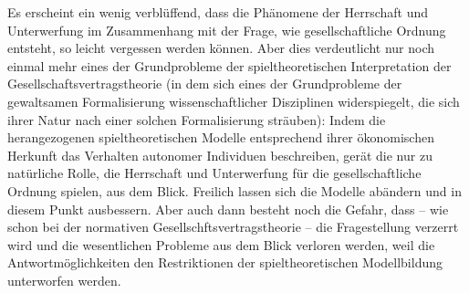 \documentclass[12pt,a4paper,ngerman]{article}
\begin{document}
Es erscheint ein wenig verblüffend, dass die Phänomene der Herrschaft
und Unterwerfung im Zusammenhang mit der Frage, wie gesellschaftliche
Ordnung entsteht, so leicht vergessen werden können. Aber dies
verdeutlicht nur noch einmal mehr eines der Grundprobleme der
spieltheoretischen Interpretation der Gesellschaftsvertragstheorie (in
dem sich eines der Grundprobleme der gewaltsamen Formalisierung
wissenschaftlicher Disziplinen widerspiegelt, die sich ihrer Natur
nach einer solchen Formalisierung sträuben): Indem die herangezogenen
spieltheoretischen Modelle entsprechend ihrer ökonomischen Herkunft
das Verhalten autonomer Individuen beschreiben, gerät die nur zu
natürliche Rolle, die Herrschaft und Unterwerfung für die
gesellschaftliche Ordnung spielen, aus dem Blick. Freilich lassen sich
die Modelle abändern und in diesem Punkt ausbessern. Aber auch dann
besteht noch die Gefahr, dass -- wie schon bei der normativen
Gesellschftsvertragstheorie -- die Fragestellung verzerrt wird und die
wesentlichen Probleme aus dem Blick verloren werden, weil die
Antwortmöglichkeiten den Restriktionen der spieltheoretischen
Modellbildung unterworfen werden.
\end{document}

